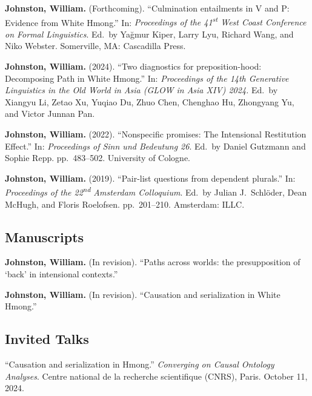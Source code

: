 \documentclass[11pt,oneside,DIV=8,parskip=off,letterpaper]{scrarticle} %
\newlength{\spacingbefore}
\newlength{\spacingafter}
\newcommand{\myonecol}[1]{%
	\vspace{\spacingbefore}%
	\begin{minipage}[t]{\linewidth}%
		\strut#1%
	\end{minipage}%
	\vspace{\spacingafter}\par%
	}
\newcommand{\pub}[1]{%
	\myonecol{#1}%
	}
\newcommand{\talk}[1]{%
	\myonecol{#1}%
	}
\begin{document}
\pub{\textbf{Johnston, William.} (Forthcoming). ``Culmination entailments in V and P: Evidence from White Hmong.'' In: \textit{Proceedings of the 41\textsuperscript{st} West Coast Conference on Formal Linguistics}. Ed.\ by Yağmur Kiper, Larry Lyu, Richard Wang, and Niko Webster. Somerville, MA: Cascadilla Press.}

\pub{\textbf{Johnston, William.} (2024). ``Two diagnostics for preposition-hood: Decomposing Path in White Hmong.'' In: \emph{Proceedings of the 14th Generative Linguistics in the Old World in Asia (GLOW in Asia XIV) 2024.} Ed.\ by Xiangyu Li, Zetao Xu, Yuqiao Du, Zhuo Chen, Chenghao Hu, Zhongyang Yu, and Victor Junnan Pan.}

\pub{\textbf{Johnston, William.} (2022). ``Nonspecific promises: The Intensional Restitution Effect.'' In: \textit{Proceedings of Sinn und Bedeutung 26}. Ed.\ by Daniel Gutzmann and Sophie Repp. pp.\ 483--502. University of Cologne.}

\pub{\textbf{Johnston, William.} (2019). ``Pair-list questions from dependent plurals.'' In: \textit{Proceedings of the 22\textsuperscript{nd} Amsterdam Colloquium}. Ed.\ by Julian J.\ Schl\"oder, Dean McHugh, and Floris Roelofsen. pp.\ 201--210. Amsterdam: ILLC.}



\subsection{Manuscripts}
\pub{\textbf{Johnston, William.} (In revision). ``Paths across worlds: the presupposition of `back' in intensional contexts.''} 

\pub{\textbf{Johnston, William.} (In revision). ``Causation and serialization in White Hmong.''} %

\subsection{Invited Talks}
\talk{``Causation and serialization in Hmong.'' \textit{Converging on Causal Ontology Analyses}. Centre national de la recherche scientifique (CNRS), Paris. October 11, 2024.}
\end{document}
